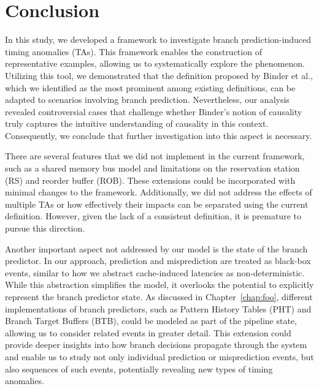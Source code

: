 \chapter{Conclusion}
In this study, we developed a framework to investigate branch prediction-induced timing anomalies (TAs). This framework enables the construction of representative examples, allowing us to systematically explore the phenomenon. Utilizing this tool, we demonstrated that the definition proposed by Binder et al., which we identified as the most prominent among existing definitions, can be adapted to scenarios involving branch prediction. Nevertheless, our analysis revealed controversial cases that challenge whether Binder's notion of causality truly captures the intuitive understanding of causality in this context. Consequently, we conclude that further investigation into this aspect is necessary.

There are several features that we did not implement in the current framework, such as a shared memory bus model and limitations on the reservation station (RS) and reorder buffer (ROB). These extensions could be incorporated with minimal changes to the framework. Additionally, we did not address the effects of multiple TAs or how effectively their impacts can be separated using the current definition. However, given the lack of a consistent definition, it is premature to pursue this direction.

Another important aspect not addressed by our model is the state of the branch predictor. In our approach, prediction and misprediction are treated as black-box events, similar to how we abstract cache-induced latencies as non-deterministic. While this abstraction simplifies the model, it overlooks the potential to explicitly represent the branch predictor state. As discussed in Chapter~\ref{chap:foo}, different implementations of branch predictors, such as Pattern History Tables (PHT) and Branch Target Buffers (BTB), could be modeled as part of the pipeline state, allowing us to consider related events in greater detail. This extension could provide deeper insights into how branch decisions propagate through the system and enable us to study not only individual prediction or misprediction events, but also sequences of such events, potentially revealing new types of timing anomalies.
